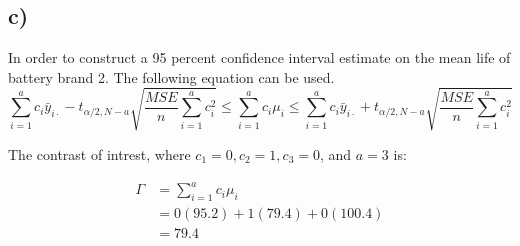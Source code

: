 \documentclass{article}
\begin{document}
\clearpage
\subsection*{c)}
In order to construct a 95 percent confidence interval estimate on
the mean life of battery brand 2. The following equation can be used. \\
\begin{equation*}
    \sum_{i=1}^{a} c_i \bar{y}_{i \cdot} - t_{\alpha/2, N-a} \sqrt{\frac{MSE}{n} \sum_{i=1}^{a} c_i^2}
    \leq \sum_{i=1}^{a} c_i \mu_i \leq
    \sum_{i=1}^{a} c_i \bar{y}_{i \cdot} + t_{\alpha/2, N-a} \sqrt{\frac{MSE}{n} \sum_{i=1}^{a} c_i^2}
\end{equation*}
\begin{flushleft}
The contrast of intrest, where $c_1 = 0, c_2 = 1, c_3 = 0$, and $a = 3$ is:
\end{flushleft}
\begin{align*}
    \Gamma &= \sum_{i=1}^{a} c_i \mu_i \\
                &= 0(95.2) + 1(79.4) + 0(100.4) \\
                &= 79.4 
    \end{align*}
\end{document}

